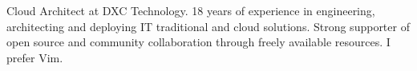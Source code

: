 
\begin{cvparagraph}

Cloud Architect at DXC Technology. 18 years of experience in engineering, architecting and deploying IT traditional and cloud solutions. Strong supporter of open source and community collaboration through freely available resources. I prefer Vim.
\end{cvparagraph}
